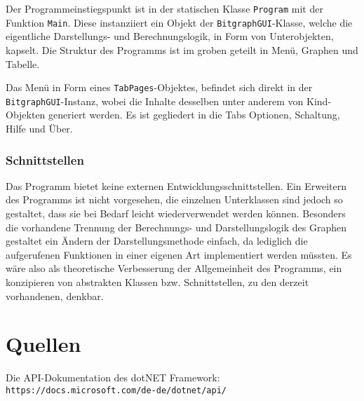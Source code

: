 \documentclass{article}
\begin{document}
    Der Programmeinstiegspunkt ist in der statischen Klasse \verb|Program| mit der Funktion \verb|Main|.
    Diese instanziiert ein Objekt der \verb|BitgraphGUI|-Klasse, welche die eigentliche Darstellungs- und Berechnungslogik, in Form von Unterobjekten, kapselt.
    Die Struktur des Programms ist im groben geteilt in Menü, Graphen und Tabelle.

    Das Menü in Form eines \verb|TabPages|-Objektes, befindet sich direkt in der \verb|BitgraphGUI|-Instanz, wobei die Inhalte desselben unter anderem von Kind-Objekten generiert werden.
    Es ist gegliedert in die Tabs \glqq Optionen\grqq{}, \glqq Schaltung\grqq{}, \glqq Hilfe\grqq{} und \glqq Über\grqq{}.

    \subsubsection{Schnittstellen}

    Das Programm bietet keine externen Entwicklungsschnittstellen.
    Ein Erweitern des Programms ist nicht vorgesehen, die einzelnen Unterklassen sind jedoch so gestaltet, dass sie bei Bedarf leicht wiederverwendet werden können.
    Besonders die vorhandene Trennung der Berechnungs- und Darstellungslogik des Graphen gestaltet ein Ändern der Darstellungsmethode einfach, da lediglich die aufgerufenen Funktionen in einer eigenen Art implementiert werden müssten.
    Es wäre also als theoretische Verbesserung der Allgemeinheit des Programms, ein konzipieren von abstrakten Klassen bzw. Schnittstellen, zu den derzeit vorhandenen, denkbar.

\newpage
\section{Quellen}

    Die API-Dokumentation des \glqq dotNET Framework\grqq{}:\\
    \verb|https://docs.microsoft.com/de-de/dotnet/api/|

\end{document}
